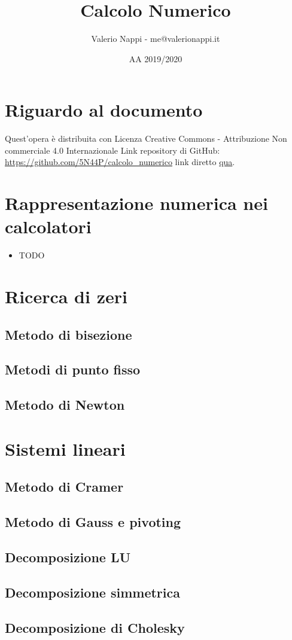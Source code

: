 \documentclass{article}
\title{Calcolo Numerico}
\author{Valerio Nappi - me@valerionappi.it}
\date{AA 2019/2020}
\begin{document}
\maketitle

\section{Riguardo al documento}
Quest'opera è distribuita con Licenza Creative Commons - Attribuzione Non commerciale 4.0 Internazionale \ccbynceu  \newline
Link repository di GitHub: \url{https://github.com/5N44P/calcolo_numerico} link diretto \href{https://github.com/5N44P/calcolo_numerico/blob/master/recap_calcolo.pdf}{qua}. \newline 

\section{Rappresentazione numerica nei calcolatori}
\begin{itemize}
	\item TODO
\end{itemize}

\section{Ricerca di zeri}

\subsection{Metodo di bisezione}

\subsection{Metodi di punto fisso}

\subsection{Metodo di Newton}


\section{Sistemi lineari}

\subsection{Metodo di Cramer}

\subsection{Metodo di Gauss e pivoting}

\subsection{Decomposizione LU}

\subsection{Decomposizione simmetrica}

\subsection{Decomposizione di Cholesky}
\end{document}
